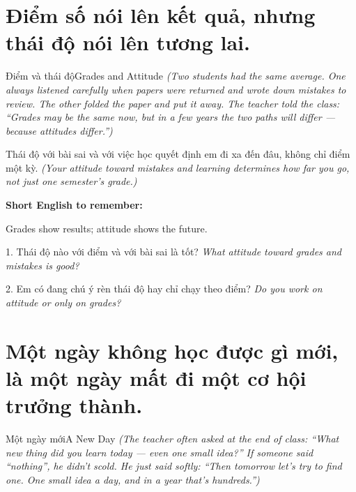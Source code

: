 \section{Điểm số nói lên kết quả, nhưng thái độ nói lên tương lai.}
\begin{truyen}{Điểm và thái độ}{Grades and Attitude}
\textit{(Two students had the same average. One always listened carefully when papers were returned and wrote down mistakes to review. The other folded the paper and put it away. The teacher told the class: ``Grades may be the same now, but in a few years the two paths will differ — because attitudes differ.'')}
\end{truyen}

\begin{baihoc}
Thái độ với bài sai và với việc học quyết định em đi xa đến đâu, không chỉ điểm một kỳ.
\textit{(Your attitude toward mistakes and learning determines how far you go, not just one semester's grade.)}
\end{baihoc}

\begin{ghinhoanh}
\textbf{Short English to remember:}

Grades show results; attitude shows the future.

\end{ghinhoanh}

\begin{tuhocnhanh}
1. Thái độ nào với điểm và với bài sai là tốt? \textit{What attitude toward grades and mistakes is good?}

2. Em có đang chú ý rèn thái độ hay chỉ chạy theo điểm? \textit{Do you work on attitude or only on grades?}
\end{tuhocnhanh}
\ngancach

\section{Một ngày không học được gì mới, là một ngày mất đi một cơ hội trưởng thành.}
\begin{truyen}{Một ngày mới}{A New Day}
\textit{(The teacher often asked at the end of class: ``What new thing did you learn today — even one small idea?'' If someone said ``nothing'', he didn't scold. He just said softly: ``Then tomorrow let's try to find one. One small idea a day, and in a year that's hundreds.'')}
\end{truyen}

